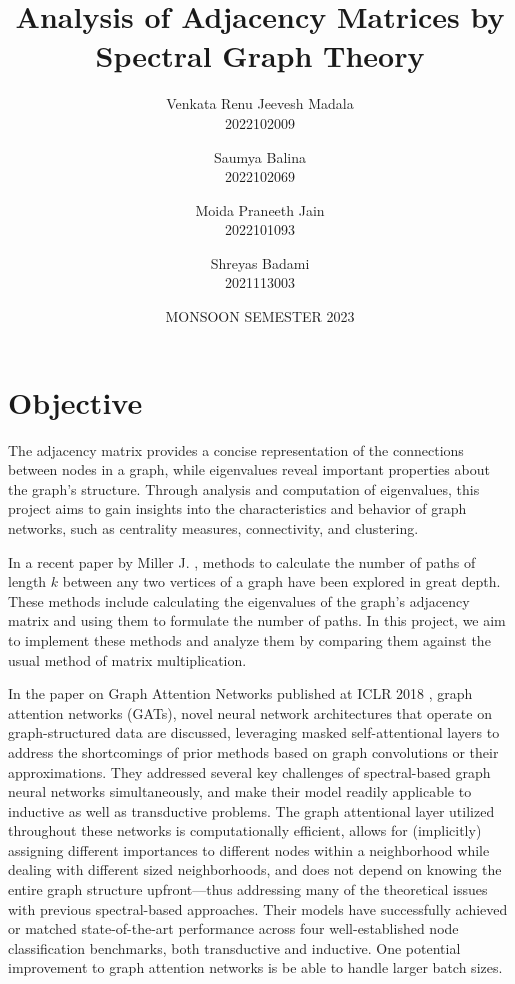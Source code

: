 \documentclass[12pt, a4paper]{article}
\title{Analysis of Adjacency Matrices by Spectral Graph Theory}
\author{
  Venkata Renu Jeevesh Madala\\
  2022102009
  \and
  Saumya Balina \\
  2022102069
  \and
  Moida Praneeth Jain \\
  2022101093
  \and
  Shreyas Badami \\
  2021113003
}
\date{MONSOON SEMESTER 2023}
\begin{document}
    \begin{titlepage}
      \maketitle
      \thispagestyle{empty}
    \end{titlepage}

    \section{Objective}
    The adjacency matrix provides a concise representation of the connections between nodes in a graph, while eigenvalues reveal important properties about
    the graph’s structure. Through analysis and computation of eigenvalues, this
    project aims to gain insights into the characteristics and behavior of graph networks, such as centrality measures, connectivity, and clustering.

      In a recent paper by Miller J. \cite{Jason}, methods to calculate the number of paths of length $k$ between any two vertices of a graph have been explored in great depth. These methods include calculating the eigenvalues of the graph's adjacency matrix and using them to formulate the number of paths. In this project, we aim to implement these methods and analyze them by comparing them against the usual method of matrix multiplication.

      In the paper on Graph Attention Networks published at ICLR 2018 \cite{GraphAttention}, graph attention networks (GATs), novel neural network architectures that operate on graph-structured data are discussed, leveraging masked self-attentional layers to address the shortcomings of prior methods based on graph convolutions or their approximations. They addressed several key challenges of spectral-based graph neural networks simultaneously, and make their model readily applicable to inductive as well as transductive problems. The graph attentional layer utilized throughout these networks is computationally efficient, allows for (implicitly) assigning different importances to different nodes within a neighborhood while dealing with different sized neighborhoods, and does not depend on knowing the entire graph structure upfront—thus addressing many of the theoretical issues with previous spectral-based approaches. Their models have successfully achieved or matched state-of-the-art performance across four well-established node classification benchmarks, both transductive and inductive. One potential improvement to graph attention networks is be able to handle larger batch sizes.
\end{document}
